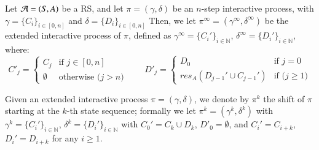 \begin{definition}
Let ${\cal A}=(S,A)$ be a RS, and let $\pi =(\gamma,\delta)$  be an  $n$-step interactive process,
with $ \gamma=\{C_i\}_{i\in[0,n]}$ and  $\delta=\{D_i\}_{i\in[0,n]}$
Then, we let $\pi^\infty= (\gamma^\infty,\delta^\infty)$ be the extended interactive process of  $\pi$,
defined as $  \gamma^\infty=\{C_i'\}_{i\in\mathbb{N}}$, $\delta^\infty=\{D_i'\}_{i\in\mathbb{N}}$, where:
$$
C'_j = \left\{
\begin{array}{ll}
C_j & \mbox{if $j\in[0,n]$}\\
\emptyset & \mbox{otherwise ($j>n$)}
\end{array}
\right.
\qquad
D'_j = \left\{
\begin{array}{ll}
D_0 & \mbox{if $j=0$}\\
\mathit{res}_A(D_{j-1}' \cup C_{j-1}') & \mbox{if ($j\geq 1$)}
\end{array}
\right.
$$
\end{definition}

Given an extended interactive process $\pi =(\gamma,\delta)$, we denote by $\pi^k$ the shift of $\pi$ starting at the $k$-th state sequence; formally we let $\pi^k=(\gamma^k,\delta^k)$ with
$\gamma^k=\{C_i'\}_{i\in\mathbb{N}}$, $\delta^k=\{D_i'\}_{i\in\mathbb{N}}$ with 
  $C_0'=C_k \cup D_k$, $D'_0 = \emptyset$, and   $C_i'=C_{i+k}$, $D_i'= D_{i+k}$ for any $i\geq 1$.





